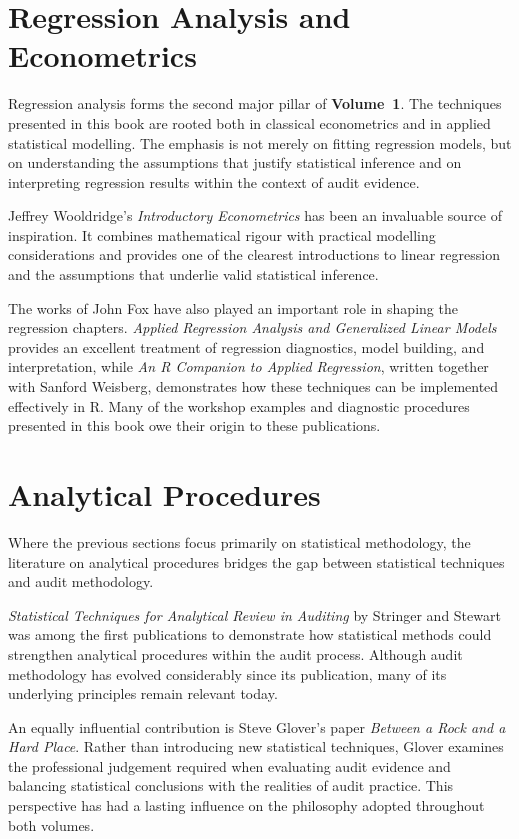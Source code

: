 \section*{Regression Analysis and Econometrics}

Regression analysis forms the second major pillar of \textbf{Volume~1}. The techniques presented in this book are rooted both in classical econometrics and in applied statistical modelling. The emphasis is not merely on fitting regression models, but on understanding the assumptions that justify statistical inference and on interpreting regression results within the context of audit evidence.

Jeffrey Wooldridge's \textit{Introductory Econometrics} has been an invaluable source of inspiration. It combines mathematical rigour with practical modelling considerations and provides one of the clearest introductions to linear regression and the assumptions that underlie valid statistical inference.

The works of John Fox have also played an important role in shaping the regression chapters. \textit{Applied Regression Analysis and Generalized Linear Models} provides an excellent treatment of regression diagnostics, model building, and interpretation, while \textit{An R Companion to Applied Regression}, written together with Sanford Weisberg, demonstrates how these techniques can be implemented effectively in \textsf{R}. Many of the workshop examples and diagnostic procedures presented in this book owe their origin to these publications.

\section*{Analytical Procedures}

Where the previous sections focus primarily on statistical methodology, the literature on analytical procedures bridges the gap between statistical techniques and audit methodology.

\textit{Statistical Techniques for Analytical Review in Auditing} by Stringer and Stewart was among the first publications to demonstrate how statistical methods could strengthen analytical procedures within the audit process. Although audit methodology has evolved considerably since its publication, many of its underlying principles remain relevant today.

An equally influential contribution is Steve Glover's paper \textit{Between a Rock and a Hard Place}. Rather than introducing new statistical techniques, Glover examines the professional judgement required when evaluating audit evidence and balancing statistical conclusions with the realities of audit practice. This perspective has had a lasting influence on the philosophy adopted throughout both volumes.

